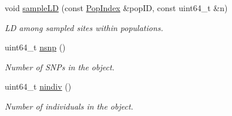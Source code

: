 \begin{DoxyCompactItemize}
void \hyperlink{classsamp_files_1_1_bed_file_i_aca4f3b7ba7fa45b6a0ed1341606858f1}{sample\+LD} (const \hyperlink{classsamp_files_1_1_pop_index}{Pop\+Index} \&pop\+ID, const uint64\+\_\+t \&n)
\begin{DoxyCompactList}\small\item\em LD among sampled sites within populations. \end{DoxyCompactList}\item 
\mbox{\label{classsamp_files_1_1_bed_file_i_a181f38c42bf368a7b1b688088cf2ce7d}} 
uint64\+\_\+t \hyperlink{classsamp_files_1_1_bed_file_i_a181f38c42bf368a7b1b688088cf2ce7d}{nsnp} ()
\begin{DoxyCompactList}\small\item\em Number of S\+N\+Ps in the object. \end{DoxyCompactList}\item 
\mbox{\label{classsamp_files_1_1_bed_file_i_a0077f55f0f23fcbaab6b62a09a626c78}} 
uint64\+\_\+t \hyperlink{classsamp_files_1_1_bed_file_i_a0077f55f0f23fcbaab6b62a09a626c78}{nindiv} ()
\begin{DoxyCompactList}\small\item\em Number of individuals in the object. \end{DoxyCompactList}\end{DoxyCompactItemize}
